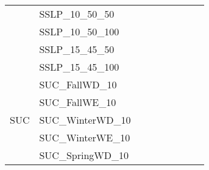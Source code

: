 \begin{table}[]
{\begin{tabular}{|c|l|l|l|l|l|l|l|l|}
			& SSLP\_10\_50\_50              &                                    &                                  &                            &                          &                                         &                                 &                                \\
			& SSLP\_10\_50\_100             &                                    &                                  &                            &                          &                                         &                                 &                                \\
			& SSLP\_15\_45\_50              &                                    &                                  &                            &                          &                                         &                                 &                                \\
			& SSLP\_15\_45\_100             &                                    &                                  &                            &                          &                                         &                                 &                                \\ \hline
			\multirow{8}{*}{SUC}     & SUC\_FallWD\_10               &                                    &                                  &                            &                          &                                         &                                 &                                \\
			& SUC\_FallWE\_10               &                                    &                                  &                            &                          &                                         &                                 &                                \\
			& SUC\_WinterWD\_10             &                                    &                                  &                            &                          &                                         &                                 &                                \\
			& SUC\_WinterWE\_10             &                                    &                                  &                            &                          &                                         &                                 &                                \\
			& SUC\_SpringWD\_10             &                                    &                                  &                            &                          &                                         &                                 &                                \\

\end{tabular}}
\end{table}
